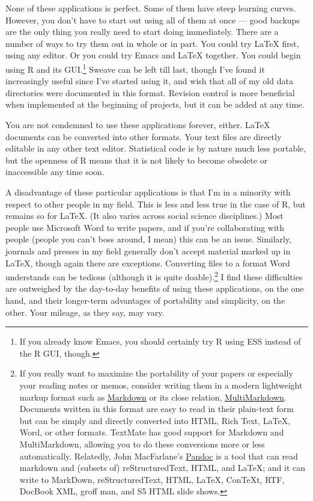 \documentclass[11pt,article,oneside]{memoir}
\begin{document}
None of these applications is perfect. Some of them have steep learning curves. However, you don't have to start out using all of them at once --- good backups are the only thing you really need to start doing immediately. There are a number of ways to try them out in whole or in part. You could try LaTeX first, using any editor. Or you could try Emacs and LaTeX together. You could begin using R and its GUI.\footnote{If you already know Emacs, you should certainly try R using ESS instead of the R GUI, though.} Sweave can be left till last, though I've found it increasingly useful since I've started using it, and wish that all of my old data directories were documented in this format. Revision control is more beneficial when implemented at the beginning of projects, but it can be added at any time. 

You are not condemned to use these applications forever, either. LaTeX documents can be converted into other formats. Your text files are directly editable in any other text editor. Statistical code is by nature much less portable, but the openness of R means that it is not likely to become obsolete or inaccessible any time soon.

A disadvantage of these particular applications is that I'm in a minority with respect to other people in my field. This is less and less true in the case of R, but remains so for LaTeX. (It also varies across social science disciplines.) Most people use Microsoft Word to write papers, and if you're collaborating with people (people you can't boss around, I mean) this can be an issue. Similarly, journals and presses in my field generally don't accept material marked up in LaTeX, though again there are exceptions. Converting files to a format Word understands can be tedious (although it is quite doable).\footnote{If you really want to maximize the portability of your papers or especially your reading notes or memos, consider writing them in a modern lightweight markup format  such as \href{http://en.wikipedia.org/wiki/Markdown}{Markdown} or its close relation, \href{http://fletcherpenney.net/MultiMarkdown}{MultiMarkdown}. Documents written in this format are easy to read in their plain-text form but can be simply and directly converted into HTML, Rich Text, LaTeX, Word, or other formats. TextMate has good support for Markdown and MultiMarkdown, allowing you to do these conversions more or less automatically. Relatedly, John MacFarlane's \href{http://johnmacfarlane.net/pandoc/}{Pandoc} is a tool that can read markdown and (subsets of) reStructuredText, HTML, and LaTeX; and it can write to MarkDown, reStructuredText, HTML, LaTeX, ConTeXt, RTF, DocBook XML, groff man, and S5 HTML slide shows.} I find these difficulties are outweighed by the day-to-day benefits of using these applications, on the one hand, and their longer-term advantages of portability and simplicity, on the other. Your mileage, as they say, may vary.
\end{document}
